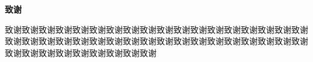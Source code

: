 
\clearpage
\thispagestyle{plain}
{}

\centerline{\bfseries 致谢}

\linespread{1.4}
\bigskip

致谢致谢致谢致谢致谢致谢致谢致谢致谢致谢致谢致谢致谢致谢致谢致谢致谢致谢致谢致谢致谢致谢致谢致谢致谢致谢致谢致谢致谢致谢致谢致谢致谢致谢致谢致谢致谢致谢致谢致谢致谢致谢致谢致谢致谢